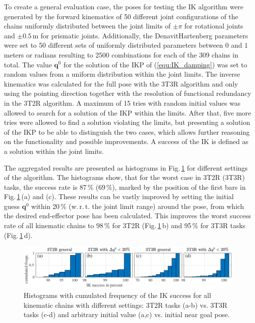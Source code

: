 \documentclass[robotics,article,submit,moreauthors,pdftex]{Definitions/mdpi}
\newcommand{\bm}[1]{\boldsymbol{#1}}
\begin{document}
To create a general evaluation case, the poses for testing the IK algorithm were generated by the forward kinematics of 50 different joint configurations of the chains uniformly distributed between the joint limits of $\pm \pi$ for rotational joints and $\pm0.5\,\mathrm{m}$ for prismatic joints.
Additionally, the Denavit\added[id=Sp]{-}Hartenberg parameters were set to 50 different sets of uniformly distributed parameters between $0$ and $1$ meters or radians resulting to 2500 combinations for each of the 309 chains in total.
The  value $\bm{q}^0$ for the solution of the IKP of (\ref{equ:IK_damping}) was set to random values from a uniform distribution within the joint limits.
The inverse kinematics was calculated for the full pose with the 3T3R algorithm and only using the pointing direction together with the resolution of functional redundancy in the 3T2R algorithm.
%
A maximum of 15 tries with random initial values was allowed to search for a solution of the IKP within the limits.
After that, five more tries were allowed to find a solution violating the limits, but presenting a solution of the IKP to be able to distinguish the two cases, which allows further reasoning on the functionality and possible improvements.
A success of the IK is defined as a solution within the joint limits.

The aggregated results are presented as histograms in Fig.\,\ref{fig:serrob_ik_hist_cdf} for different settings of the algorithm.
The histograms show, that for the worst case in 3T2R (3T3R) tasks, the success rate is 87\,\% (69\,\%), marked by the position of the first bars in Fig.\,\ref{fig:serrob_ik_hist_cdf}\,(a) and (c).
These results can be vastly improved by setting the initial guess $\bm{q}^0$ within 20\,\% (w.\,r.\,t. the joint limit range) around the pose, from which the desired end-effector pose has been calculated.
This improves the worst success rate of all kinematic chains to 98\,\% for 3T2R (Fig.\,\ref{fig:serrob_ik_hist_cdf}\,b) and 95\,\% for 3T3R tasks (Fig.\,\ref{fig:serrob_ik_hist_cdf}\,d).


%
\begin{figure}[b]
    \includegraphics{serrob_ik_hist_cdf_all.pdf}
    \caption{Histograms with cumulated frequency of the IK success for all kinematic chains with different settings: 3T2R tasks (a-b) vs. 3T3R tasks (c-d) and arbitrary initial value (a,c) vs. initial near goal pose.}
    \label{fig:serrob_ik_hist_cdf}
\end{figure} 
%
\end{document}
